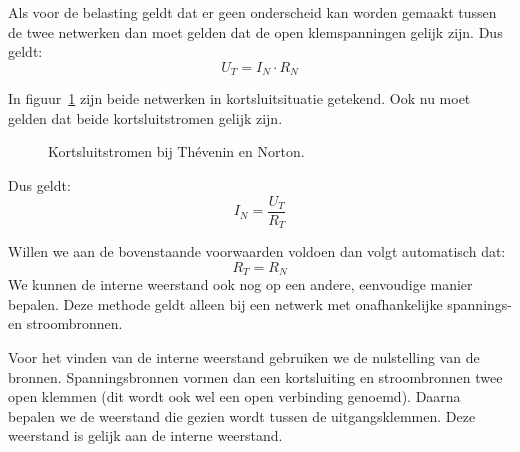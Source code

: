  Als voor de belasting geldt dat er geen
onderscheid kan worden gemaakt tussen de twee netwerken dan moet gelden dat de open klemspanningen
gelijk zijn. Dus geldt:
%
\begin{equation}
U_T = I_N\cdot R_N
\end{equation}

In figuur~\ref{fig:gelkortsluitstromenbijtheveninennorton} zijn beide netwerken in kortsluitsituatie
getekend. Ook nu moet gelden dat beide kortsluitstromen gelijk zijn.
\begin{figure}[!ht]
\centering
\begin{subfigure}[b]{0.48\textwidth}
\centering
{}
\end{subfigure}%
\begin{subfigure}[b]{0.48\textwidth}
\centering
{}
\end{subfigure}
\caption{Kortsluitstromen bij Th\'evenin en Norton.}
\label{fig:gelkortsluitstromenbijtheveninennorton}
\end{figure}

Dus geldt:
%
\begin{equation}
I_N = \dfrac{U_T}{R_T}
\end{equation}

Willen we aan de bovenstaande voorwaarden voldoen dan volgt automatisch dat:
%
\begin{equation}
R_T = R_N
\end{equation}
%
We kunnen de interne weerstand ook nog op een andere, eenvoudige manier bepalen. Deze methode geldt alleen bij een netwerk met onafhankelijke spannings- en stroombronnen.

Voor het vinden van de interne weerstand gebruiken we de nulstelling van de bronnen. Spanningsbronnen vormen dan een kortsluiting en stroombronnen twee open klemmen (dit wordt ook wel een open verbinding genoemd). Daarna bepalen we de weerstand die gezien wordt tussen de uitgangsklemmen. Deze weerstand is gelijk aan de interne weerstand.

